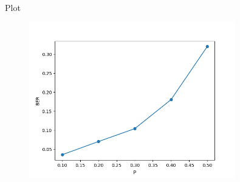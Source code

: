 \begin{frame}
\begin{alertblock}{Plot}
   \begin{figure}
       \includegraphics[width = 0.8\textwidth]{BEC/BEC.png}
   \end{figure}
  \end{alertblock}
\end{frame}